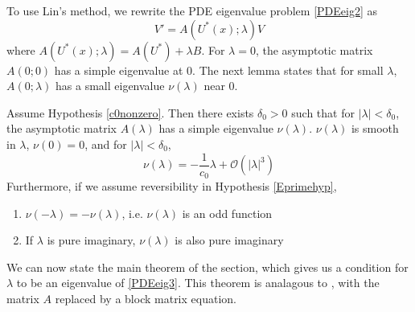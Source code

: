 \documentclass[thesis.tex]{subfiles}
\begin{document}
To use Lin's method, we rewrite the PDE eigenvalue problem \eqref{PDEeig2} as
\begin{equation}\label{PDEeig3}
V' = A(U^*(x); \lambda)V 
\end{equation} 
where $A(U^*(x); \lambda) = A(U^*) + \lambda B$. For $\lambda = 0$, the asymptotic matrix $A(0; 0)$ has a simple eigenvalue at 0. The next lemma states that for small $\lambda$, $A(0; \lambda)$ has a small eigenvalue $\nu(\lambda)$ near 0.

\begin{lemma}\label{nulambdalemma}
Assume Hypothesis \ref{c0nonzero}. Then there exists $\delta_0 > 0$ such that for $|\lambda| < \delta_0$, the asymptotic matrix $A(\lambda)$ has a simple eigenvalue $\nu(\lambda)$. $\nu(\lambda)$ is smooth in $\lambda$, $\nu(0) = 0$, and for $|\lambda| < \delta_0$,
\begin{equation}\label{nulambda}
\nu(\lambda) = -\frac{1}{c_0} \lambda + \mathcal{O}(|\lambda|^3)
\end{equation}
Furthermore, if we assume reversibility in Hypothesis \ref{Eprimehyp},
\begin{enumerate}
\item $\nu(-\lambda) = -\nu(\lambda)$, i.e. $\nu(\lambda)$ is an odd function 
\item If $\lambda$ is pure imaginary, $\nu(\lambda)$ is also pure imaginary
\end{enumerate}
\end{lemma}

We can now state the main theorem of the section, which gives us a condition for $\lambda$ to be an eigenvalue of \eqref{PDEeig3}. This theorem is analagous to \cite[Theorem 2]{Sandstede1998}, with the matrix $A$ replaced by a block matrix equation.
\end{document}
